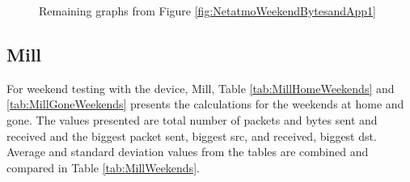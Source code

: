 \begin{figure}[H]
\begin{subfigure}[b]{0.47\textwidth}
    \end{subfigure}
   \begin{subfigure}[b]{0.47\textwidth}
    \end{subfigure}
    \begin{subfigure}[b]{0.47\textwidth}
    \end{subfigure}
    \begin{subfigure}[b]{0.47\textwidth}
    \end{subfigure}
    \hspace{0.6cm}
    \begin{subfigure}[b]{0.47\textwidth}
    \end{subfigure}
    \caption{Remaining graphs from Figure \ref{fig:NetatmoWeekendBytesandApp1}}
    \label{fig:NetatmoWeekendBytesandApp2}
\end{figure}

\subsection{Mill}
For weekend testing with the device, Mill, Table \ref{tab:MillHomeWeekends} and \ref{tab:MillGoneWeekends} presents the calculations for the weekends at home and gone. The values presented are total number of packets and bytes sent and received and the biggest packet sent, biggest src, and received, biggest dst. Average and standard deviation values from the tables are combined and compared in Table \ref{tab:MillWeekends}. 

